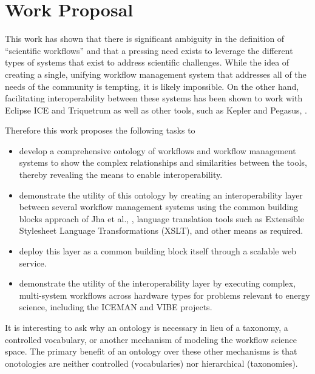 \chapter{Work Proposal}

This work has shown that there is significant ambiguity in the
definition of ``scientific workflows'' and that a pressing need exists
to leverage the different types of systems that exist to address
scientific challenges. While the idea of creating a single, unifying
workflow management system that addresses all of the needs of the
community is tempting, it is likely impossible. On the other hand,
facilitating interoperability between these systems has been shown to
work with Eclipse ICE and Triquetrum as well as other tools, such as
Kepler and Pegasus, \cite{mandal_integrating_2007}.

Therefore this work proposes the following tasks to

\begin{itemize}
\itemsep1pt\parskip0pt
\item
  develop a comprehensive ontology of workflows and workflow management
  systems to show the complex relationships and similarities between the
  tools, thereby revealing the means to enable interoperability.
\item
  demonstrate the utility of this ontology by creating an
  interoperability layer between several workflow management systems
  using the common building blocks approach of Jha et al.,
  \cite{jha_building_2016}, language translation tools such as Extensible Stylesheet Language Transformations (XSLT), and other means as required.
\item
  deploy this layer as a common building block itself through a scalable
  web service.
\item
  demonstrate the utility of the interoperability layer by executing
  complex, multi-system workflows across hardware types for problems
  relevant to energy science, including the ICEMAN and VIBE projects.
\end{itemize}

It is interesting to ask why an ontology is necessary in lieu of a
taxonomy, a controlled vocabulary, or another mechanism of modeling the
workflow science space. The primary benefit of an ontology over these
other mechanisms is that onotologies are neither controlled
(vocabularies) nor hierarchical (taxonomies).

